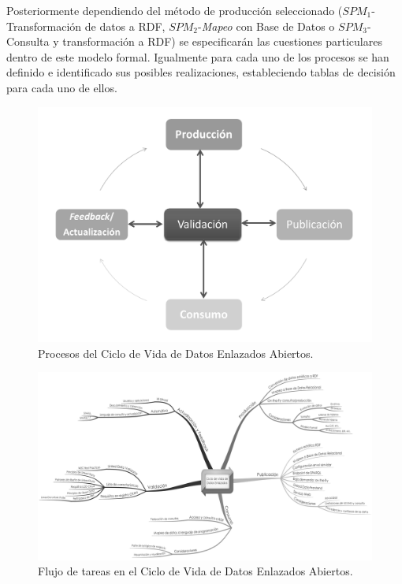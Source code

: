 \documentclass[a4paper,final,11pt,fleqn,twoside]{book}  %
\begin{document}
Posteriormente dependiendo del método de producción seleccionado ($SPM_1$-Transformación de datos a RDF, $SPM_2$-\textit{Mapeo} con Base de Datos o $SPM_3$-Consulta y transformación a RDF) 
se especificarán las cuestiones particulares dentro de este modelo formal. Igualmente para cada uno de los procesos se han definido 
e identificado sus posibles realizaciones, estableciendo tablas de decisión para cada uno de ellos.

\begin{figure}[htb]
\centering
 \includegraphics[width=16cm]{img/lld}
\caption{Procesos del Ciclo de Vida de Datos Enlazados Abiertos.}\label{lld}
\end{figure}

\begin{figure}[htb]
\centering
 \includegraphics[width=16cm]{img/ldl}
\caption{Flujo de tareas en el Ciclo de Vida de Datos Enlazados Abiertos.}\label{tareas}
\end{figure}
\end{document}
